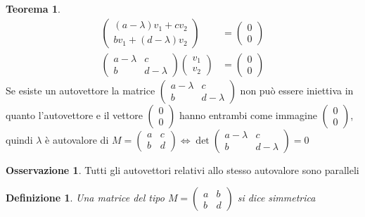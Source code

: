 \documentclass[10pt,a4paper]{article}
\theoremstyle{plain}
\newtheorem{definizione}[subsection]{Definizione}
\theoremstyle{definition}
\newtheorem{teorema}[subsection]{Teorema}
\newtheorem{osservazione}[subsection]{Osservazione}
\begin{document}
\begin{teorema}
\begin{align*}
	\begin{pmatrix}
	(a-\lambda)v_1 + cv_2 \\ bv_1 + (d-\lambda)v_2
	\end{pmatrix}
	&=
	\begin{pmatrix}
		0  \\ 0
	\end{pmatrix}
	\\
	\begin{pmatrix}
		a-\lambda & c \\ b & d-\lambda
	\end{pmatrix}
	\begin{pmatrix}
		v_1 \\ v_2
	\end{pmatrix}
	&=
	\begin{pmatrix}
		0 \\ 0
	\end{pmatrix}
\end{align*}
Se esiste un autovettore la matrice $\begin{pmatrix}
a-\lambda & c \\ b & d-\lambda
\end{pmatrix}$ non può essere iniettiva in quanto l'autovettore e il vettore $\begin{pmatrix}
	0 \\ 0
\end{pmatrix}$ hanno entrambi come immagine $\begin{pmatrix}
	0 \\ 0
\end{pmatrix}$, quindi $\lambda$ è autovalore di $M = \begin{pmatrix}
	a & c \\ b & d
\end{pmatrix} \Leftrightarrow \det{\begin{pmatrix}
	a-\lambda & c \\ b & d-\lambda
\end{pmatrix}}=0$ 
\end{teorema}
\begin{osservazione}
	Tutti gli autovettori relativi allo stesso autovalore sono paralleli
\end{osservazione}
\begin{definizione}
	Una matrice del tipo $M=\begin{pmatrix}
		a & b \\ b & d
	\end{pmatrix}$ si dice simmetrica
\end{definizione}
\end{document}
